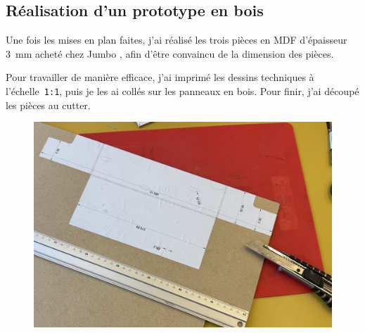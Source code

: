 \begin{minipage}[c]{0.48\textwidth}
    \subsection{Réalisation d'un prototype en bois} \label{prototype_bois}
    Une fois les mises en plan faites, j'ai réalisé les trois pièces en MDF d'épaisseur 3~mm acheté chez Jumbo \cite{mdfJumbo}, afin d'être convaincu de la dimension des pièces.

    Pour travailler de manière efficace, j'ai imprimé les dessins techniques à l'échelle~\texttt{1:1}, puis je les ai collés sur les panneaux en bois. Pour finir, j'ai découpé les pièces au cutter.
    \vspace{1em}
\end{minipage}\hfill
\begin{minipage}[c]{0.48\textwidth}
    \begin{figure}[H]
        \centering
        \includegraphics[width=\textwidth]{assets/figures/Protections_laser/Securite_mecanique/Protection_entree_laser/decoupe_bois.jpeg}
        \label{decoupe_bois}
    \end{figure}
\end{minipage}

